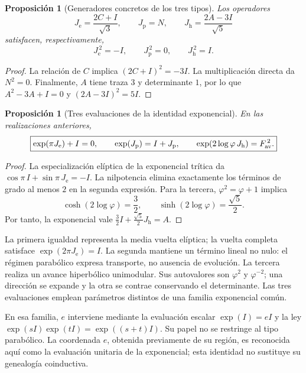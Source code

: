 \documentclass[a4paper,10pt]{article}
\newtheorem{proposition}[theorem]{Proposición}
\theoremstyle{definition}\newtheorem{definition}[theorem]{Definición}
\theoremstyle{remark}\newtheorem{remark}[theorem]{Observación}
\numberwithin{equation}{section}
\begin{document}
\begin{proposition}[Generadores concretos de los tres tipos]
\label{euler-trit-generadores}
Los operadores
\[
 J_{\mathrm e}=\frac{2C+I}{\sqrt3},\qquad
 J_{\mathrm p}=N,\qquad
 J_{\mathrm h}=\frac{2A-3I}{\sqrt5}
\]
satisfacen, respectivamente,
\[
 J_{\mathrm e}^{\,2}=-I,\qquad
 J_{\mathrm p}^{\,2}=0,\qquad
 J_{\mathrm h}^{\,2}=I.
\]
\end{proposition}
\begin{proof}
La relación de \(C\) implica \((2C+I)^2=-3I\).
La multiplicación directa da \(N^2=0\).
Finalmente, \(A\) tiene traza \(3\) y determinante \(1\), por lo que
\(A^2-3A+I=0\) y \((2A-3I)^2=5I\).
\end{proof}

\begin{proposition}[Tres evaluaciones de la identidad exponencial]
\label{euler-trit-evaluaciones}
En las realizaciones anteriores,
\begin{equation}
 \boxed{
 \exp(\pi J_{\mathrm e})+I=0,\qquad
 \exp(J_{\mathrm p})=I+J_{\mathrm p},\qquad
 \exp(2\log\varphi\,J_{\mathrm h})=F_{\rm av}^{\,2}.}
 \label{euler-trit-tres-evaluaciones}
\end{equation}
\end{proposition}
\begin{proof}
La especialización elíptica de la exponencial trítica da
\(\cos\pi\,I+\sin\pi\,J_{\mathrm e}=-I\).
La nilpotencia elimina exactamente los términos de grado al menos \(2\)
en la segunda expresión. Para la tercera, \(\varphi^2=\varphi+1\) implica
\[
 \cosh(2\log\varphi)=\frac32,\qquad
 \sinh(2\log\varphi)=\frac{\sqrt5}{2}.
\]
Por tanto, la exponencial vale
\(\frac32I+\frac{\sqrt5}{2}J_{\mathrm h}=A\).
\end{proof}

La primera igualdad representa la media vuelta elíptica; la vuelta completa
satisface \(\exp(2\pi J_{\mathrm e})=I\). La segunda mantiene un término
lineal no nulo: el régimen parabólico expresa transporte, no ausencia de
evolución. La tercera realiza un avance hiperbólico unimodular. Sus
autovalores son \(\varphi^2\) y \(\varphi^{-2}\); una dirección se expande y
la otra se contrae conservando el determinante. Las tres evaluaciones
emplean parámetros distintos de una familia exponencial común.

En esa familia, \(e\) interviene mediante la evaluación escalar
\(\exp(I)=eI\) y la ley \(\exp(sI)\exp(tI)=\exp((s+t)I)\).
Su papel no se restringe al tipo parabólico. La coordenada \(e\), obtenida
previamente de su región, es reconocida aquí como la evaluación unitaria
de la exponencial; esta identidad no sustituye su genealogía coinductiva.
\end{document}
